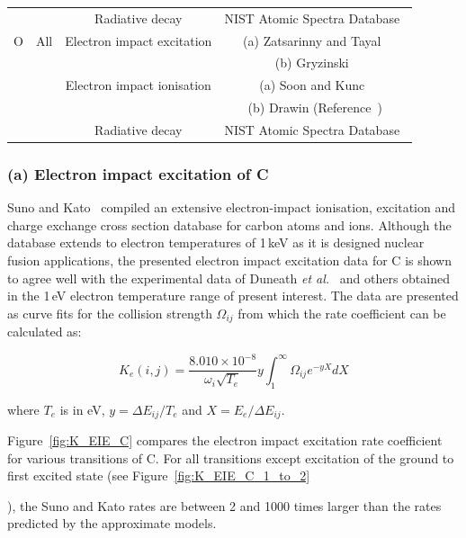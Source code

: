 {\begin{table}[bht]
\begin{tabular*}{1.0\textwidth}{cccc}
                                                     &       & Radiative decay                                 & NIST Atomic Spectra Database~\cite{NIST_ASD} \\
                  O                                & All & Electron impact excitation                & (a) Zatsarinny and Tayal~\cite{ZT2003} \\
                                                     &       &                                                               & (b) Gryzinski~\cite{Gryz59} \\
                                                     &       & Electron impact ionisation               & (a) Soon and Kunc~\cite{SK1990} \\
                                                     &       &                                                               & (b) Drawin (Reference~\cite{panesi_phd}) \\
                                                     &       & Radiative decay                                 & NIST Atomic Spectra Database~\cite{NIST_ASD} \\                                   
  \hline
 \end{tabular*}
\end{table}


\subsubsection{(a) Electron impact excitation of C}


Suno and Kato~\cite{SK2006} compiled an extensive electron-impact ionisation, excitation and charge exchange cross section database for carbon atoms and ions.
Although the database extends to electron temperatures of 1\,keV as it is designed nuclear fusion applications, the presented electron impact excitation data for C is shown to agree well with the experimental data of Duneath \textit{et al.}~\cite{DFB+1997} and others obtained in the 1\,eV electron temperature range of present interest.
The data are presented as curve fits for the collision strength $\Omega_{ij}$ from which the rate coefficient can be calculated as:

\begin{equation}
 K_e(i,j) = \frac{8.010 \times 10^{-8}}{\omega_i \sqrt{T_e}} y \int_1^\infty \Omega_{ij} e^{-y X} dX 
\end{equation}

\noindent where $T_e$ is in eV, $y = \Delta E_{ij} / T_e$ and $X = E_e / \Delta E_{ij}$.

\par

Figure~\ref{fig:K_EIE_C} compares the electron impact excitation rate coefficient for various transitions of C.
For all transitions except excitation of the ground to first excited state (see Figure~\ref{fig:K_EIE_C_1_to_2}}), the Suno and Kato rates are between 2 and 1000 times larger than the rates predicted by the approximate models.
